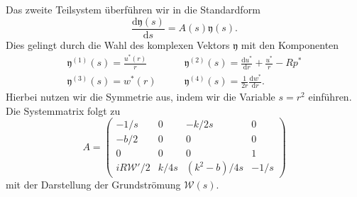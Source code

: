 \documentclass[10pt,a5paper,oneside,draft]{book}
\numberwithin{equation}{chapter}
\begin{document}
Das zweite Teilsystem \"uberf\"uhren wir in die Standardform
\begin{equation}\label{eq:shoot:system}
	\frac{\mathrm{d} \mathfrak{y}(s)}{\mathrm{d} s} = A(s) \mathfrak{y}(s).
\end{equation}
Dies gelingt durch die Wahl des komplexen Vektors $\mathfrak{y}$ mit den Komponenten
\begin{equation}
	\begin{split}
	\mathfrak{y}^{(1)}(s) = \frac{u^*(r)}{r} \qquad &\mathfrak{y}^{(2)}(s) = \frac{\mathrm{d} u^*}{\mathrm{d} r} + \frac{u^*}{r} - Rp^*\\
	\mathfrak{y}^{(3)}(s) = w^*(r) \qquad & \mathfrak{y}^{(4)}(s) = \frac{1}{2r} \frac{\mathrm{d} w^*}{\mathrm{d} r}.
	\end{split}
\end{equation}
Hierbei nutzen wir die Symmetrie aus, indem wir die Variable $s = r^2$ einf\"uhren.
Die Systemmatrix folgt zu
\begin{equation}
	A = \left(
	\begin{array}{cccc}
		-1/s & 0 & -k/2s & 0\\
		-b/2 & 0 & 0 & 0\\
		0 & 0 & 0 & 1\\
		iR\mathscr{W}'/2 & k/4s & (k^2-b)/4s & -1/s
	\end{array}
	\right)
\end{equation}
mit der Darstellung der Grundstr\"omung $\mathscr{W}(s)$.\\
\end{document}

